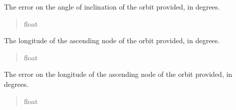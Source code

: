 \documentclass[letterpaper,11pt,english]{sphinxmanual}
\begin{document}
\begin{savenotes}
\begin{fulllineitems}
\begin{savenotes}\begin{fulllineitems}
\label{\detokenize{code/opihiexarata.orbit.custom:opihiexarata.orbit.custom.CustomOrbitEngine.inclination_error}}
\pysigstartsignatures
{}
\pysigstopsignatures
\sphinxAtStartPar
The error on the angle of inclination of the orbit provided, in degrees.
\begin{quote}\begin{description}
\sphinxAtStartPar
float

\end{description}\end{quote}

\end{fulllineitems}\end{savenotes}


\begin{savenotes}\begin{fulllineitems}
\label{\detokenize{code/opihiexarata.orbit.custom:opihiexarata.orbit.custom.CustomOrbitEngine.longitude_ascending_node}}
\pysigstartsignatures
{}
\pysigstopsignatures
\sphinxAtStartPar
The longitude of the ascending node of the orbit provided, in degrees.
\begin{quote}\begin{description}
\sphinxAtStartPar
float

\end{description}\end{quote}

\end{fulllineitems}\end{savenotes}


\begin{savenotes}\begin{fulllineitems}
\label{\detokenize{code/opihiexarata.orbit.custom:opihiexarata.orbit.custom.CustomOrbitEngine.longitude_ascending_node_error}}
\pysigstartsignatures
{}
\pysigstopsignatures
\sphinxAtStartPar
The error on the longitude of the ascending node of the orbit
provided, in degrees.
\begin{quote}\begin{description}
\sphinxAtStartPar
float


\end{description}
\end{quote}
\end{fulllineitems}
\end{savenotes}
\end{fulllineitems}
\end{savenotes}
\end{document}
